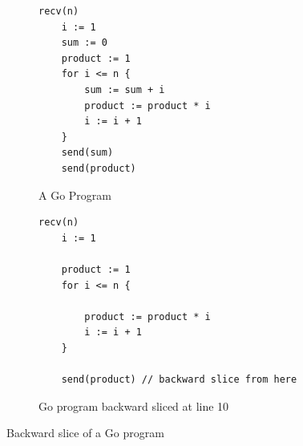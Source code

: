 \begin{figure}
\begin{subfigure}[b]{\linewidth}
\centering
 \begin{lstlisting}[]
	recv(n)
	i := 1
	sum := 0
	product := 1
	for i <= n {
		sum := sum + i
		product := product * i
		i := i + 1
	}
	send(sum)
	send(product)
\end{lstlisting}
        \vspace{-2mm}
                \caption{A Go Program}
        \end{subfigure}

\begin{subfigure}[b]{\linewidth}
\centering
\begin{lstlisting}[]
	recv(n)
	i := 1

	product := 1
	for i <= n {
		
		product := product * i
		i := i + 1
	}
	
	send(product) // backward slice from here
\end{lstlisting}
        \vspace{-2mm}
                \caption{Go program backward sliced at line 10}
        \end{subfigure}
                        \caption{Backward slice of a Go program \cite{Tip} }
                \label{Fig:backslice}
\end{figure}






